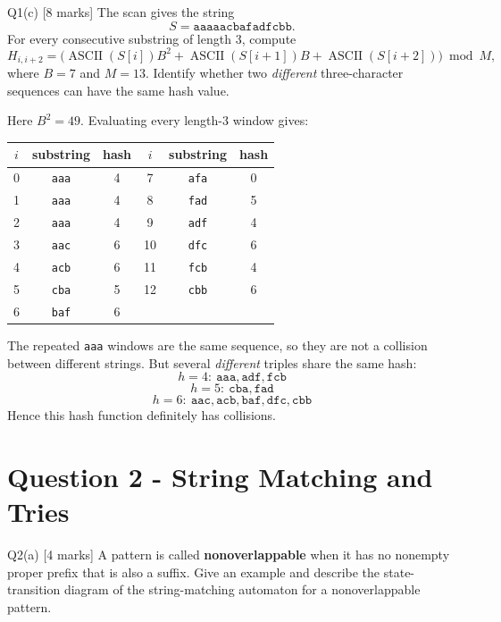 \documentclass[10.5pt,a4paper]{article}
\begin{document}
\begin{questionbox}{Q1(c) [8 marks]}
The scan gives the string
\[
S=\texttt{aaaaacbafadfcbb}.
\]
For every consecutive substring of length $3$, compute
\[
H_{i,i+2}
=
\bigl(\operatorname{ASCII}(S[i])B^2
+\operatorname{ASCII}(S[i+1])B
+\operatorname{ASCII}(S[i+2])\bigr)\bmod M,
\]
where $B=7$ and $M=13$. Identify whether two \emph{different} three-character sequences can have the same hash value.
\end{questionbox}

\begin{answerbox}
Here $B^2=49$. Evaluating every length-$3$ window gives:

\begin{center}
\small
\begin{tabular}{c c c@{\qquad}c c c}
\toprule
$i$ & substring & hash & $i$ & substring & hash\\
\midrule
0 & \texttt{aaa} & 4 & 7 & \texttt{afa} & 0\\
1 & \texttt{aaa} & 4 & 8 & \texttt{fad} & 5\\
2 & \texttt{aaa} & 4 & 9 & \texttt{adf} & 4\\
3 & \texttt{aac} & 6 & 10 & \texttt{dfc} & 6\\
4 & \texttt{acb} & 6 & 11 & \texttt{fcb} & 4\\
5 & \texttt{cba} & 5 & 12 & \texttt{cbb} & 6\\
6 & \texttt{baf} & 6 & & &\\
\bottomrule
\end{tabular}
\end{center}

The repeated \texttt{aaa} windows are the same sequence, so they are not a collision between different strings. But several \emph{different} triples share the same hash:
\[
\boxed{h=4:\ \texttt{aaa},\texttt{adf},\texttt{fcb}}
\]
\[
\boxed{h=5:\ \texttt{cba},\texttt{fad}}
\]
\[
\boxed{h=6:\ \texttt{aac},\texttt{acb},\texttt{baf},\texttt{dfc},\texttt{cbb}}
\]
Hence this hash function definitely has collisions.
\end{answerbox}

\section{Question 2 - String Matching and Tries}

\begin{questionbox}{Q2(a) [4 marks]}
A pattern is called \textbf{nonoverlappable} when it has no nonempty proper prefix that is also a suffix. Give an example and describe the state-transition diagram of the string-matching automaton for a nonoverlappable pattern.
\end{questionbox}
\end{document}
